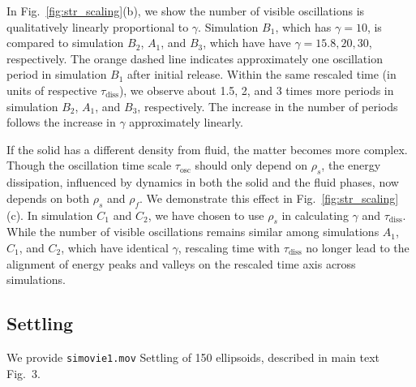\documentclass[times, 10pt]{article}
\begin{document}
\begin{enumerate}
		\qquad In Fig.~\ref{fig:str_scaling}(b), we show the number of visible oscillations is qualitatively linearly proportional to $\gamma$.
		Simulation $B_1$, which has $\gamma = 10$, is compared to simulation $B_2$, $A_1$, and $B_3$, which have have $\gamma = 15.8, 20, 30$, respectively.
		The orange dashed line indicates approximately one oscillation period in simulation $B_1$ after initial release.
		Within the same rescaled time (in units of respective $\tau_\text{diss}$), we observe about 1.5, 2, and 3 times more periods in simulation  $B_2$, $A_1$, and $B_3$, respectively. The increase in the number of periods follows the increase in $\gamma$ approximately linearly.

		\qquad If the solid has a different density from fluid, the matter becomes more complex.
		Though the oscillation time scale $\tau_\text{osc}$ should only depend on $\rho_s$, the energy dissipation, influenced by dynamics in both the solid and the fluid phases, now depends on both $\rho_s$ and $\rho_f$.
		We demonstrate this effect in Fig.~\ref{fig:str_scaling}(c).
		In simulation $C_1$ and $C_2$, we have chosen to use $\rho_s$ in calculating $\gamma$ and $\tau_\text{diss}$.
		While the number of visible oscillations remains similar among simulations $A_1$, $C_1$, and $C_2$, which have identical $\gamma$,
		rescaling time with $\tau_\text{diss}$ no longer lead to the alignment of energy peaks and valleys on the rescaled time axis across simulations.
	\end{enumerate}

	\subsection{Settling}
		We provide \texttt{si\textunderscore movie\textunderscore 1.mov} {Settling of 150 ellipsoids, described in main text Fig.~3.}
	
\end{document}
